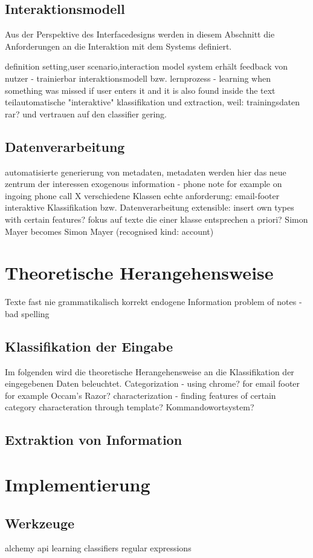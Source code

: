 \subsection{Interaktionsmodell}
Aus der Perspektive des Interfacedesigns werden in diesem Abschnitt die Anforderungen an die Interaktion mit dem Systems definiert.

definition setting,user scenario,interaction model
system erhält feedback von nutzer - trainierbar
interaktionsmodell bzw. lernprozess - learning when something was missed if user enters it and it is also found inside the text
teilautomatische "interaktive" klassifikation und extraction, weil: trainingsdaten rar? und vertrauen auf den classifier gering.
\subsection{Datenverarbeitung}
automatisierte generierung von metadaten, metadaten werden hier das neue zentrum der interessen
exogenous information - phone note for example on ingoing phone call
X verschiedene Klassen
echte anforderung: email-footer
interaktive Klassifikation bzw. Datenverarbeitung
extensible: insert own types with certain features?
fokus auf texte die einer klasse entsprechen
a priori?
Simon Mayer becomes Simon Mayer (recognised kind: account)
\section{Theoretische Herangehensweise}
Texte fast nie grammatikalisch korrekt
endogene Information
problem of notes - bad spelling
\subsection{Klassifikation der Eingabe}
Im folgenden wird die theoretische Herangehensweise an die Klassifikation der eingegebenen Daten beleuchtet.
Categorization - using chrome? for email footer for example
Occam's Razor?
characterization - finding features of certain category
characteration through template?
Kommandowortsystem?
\subsection{Extraktion von Information}

\section{Implementierung}
\subsection{Werkzeuge}
alchemy api
learning classifiers
regular expressions

